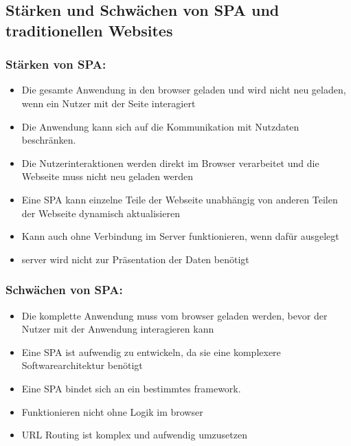 \subsection{Stärken und Schwächen von \ac{SPA} und traditionellen Websites}

\subsubsection*{Stärken von \ac{SPA}:}
\begin{itemize}
  \item Die gesamte Anwendung in den \gls{browser} geladen und wird nicht neu geladen, wenn ein Nutzer mit der Seite interagiert \cite{Smith2022} \cite{Flanagan2011}
  \item Die Anwendung kann sich auf die Kommunikation mit Nutzdaten beschränken. \cite{Smith2022} \cite{Flanagan2011}
  \item Die Nutzerinteraktionen werden direkt im Browser verarbeitet und die Webseite muss nicht neu geladen werden \cite{Smith2022} \cite{Flanagan2011}
  \item Eine \ac{SPA} kann einzelne Teile der Webseite unabhängig von anderen Teilen der Webseite dynamisch aktualisieren \cite{Smith2022} \cite{Irudayaraj2019}
  \item Kann auch ohne Verbindung im Server funktionieren, wenn dafür ausgelegt \cite{Smith2022} \cite{Gavrila2019}
  \item \gls{server} wird nicht zur Präsentation der Daten benötigt \cite{Flanagan2011}
\end{itemize}


\subsubsection*{Schwächen von \ac{SPA}:}

\begin{itemize}
  \item Die komplette Anwendung muss vom \gls{browser} geladen werden, bevor der Nutzer mit der Anwendung interagieren kann \cite{Smith2022} \cite{Gavrila2019}
  \item Eine \ac{SPA} ist aufwendig zu entwickeln, da sie eine komplexere Softwarearchitektur benötigt \cite{Smith2022} \cite{Flanagan2011}
  \item Eine \ac{SPA} bindet sich an ein bestimmtes \gls{framework}. \cite{Smith2022}
  \item Funktionieren nicht ohne Logik im \gls{browser} \cite{Smith2022}
  \item \ac{URL} Routing ist komplex und aufwendig umzusetzen \cite{Smith2022}
\end{itemize}

